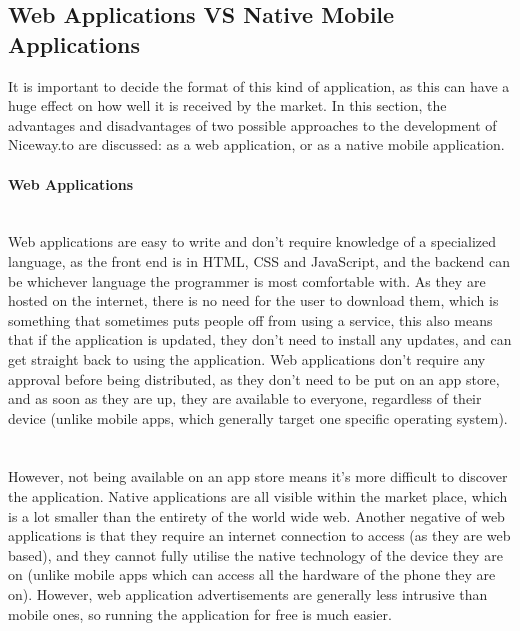 \subsection{Web Applications VS Native Mobile Applications}
It is important to decide the format of this kind of application, as this can have a huge effect on how well it is received by the market. In this section, the advantages and disadvantages of two possible approaches to the development of Niceway.to are discussed: as a web application, or as a native mobile application.

\paragraph{Web Applications}\ \\
Web applications are easy to write and don't require knowledge of a specialized language, as the front end is in HTML, CSS and JavaScript, and the backend can be whichever language the programmer is most comfortable with. As they are hosted on the internet, there is no need for the user to download them, which is something that sometimes puts people off from using a service, this also means that if the application is updated, they don't need to install any updates, and can get straight back to using the application. Web applications don't require any approval before being distributed, as they don't need to be put on an app store, and as soon as they are up, they are available to everyone, regardless of their device (unlike mobile apps, which generally target one specific operating system). \ \\
\ \\
However, not being available on an app store means it's more difficult to discover the application. Native applications are all visible within the market place, which is a lot smaller than the entirety of the world wide web. Another negative of web applications is that they require an internet connection to access (as they are web based), and they cannot fully utilise the native technology of the device they are on (unlike mobile apps which can access all the hardware of the phone they are on). However, web application advertisements are generally less intrusive than mobile ones, so running the application for free is much easier.

